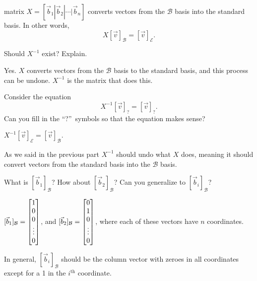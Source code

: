	matrix $X=[\vec b_1|\vec b_2|\cdots|\vec b_n]$ converts
	vectors from the $\mathcal B$ basis into the standard basis. In other words,
	\[
		X[\vec v]_{\mathcal B} = [\vec v]_{\mathcal E}.
	\]
	\begin{parts}
		\item Should $X^{-1}$ exist? Explain.
			\begin{solution}
				Yes. $X$ converts vectors from the
				$\mathcal B$ basis to the standard basis, and this process can be undone.
				$X^{-1}$ is the matrix that does this.
			\end{solution}
		\item Consider the equation
			\[
				X^{-1}[\vec v]_{?} = [\vec v]_{?}.
			\]
			Can you fill in the ``?''~symbols so that the equation makes sense?
			\begin{solution}
				$X^{-1}[\vec v]_{\mathcal E} = [\vec v]_{\mathcal B}$.

				As we said in the previous part $X^{-1}$ should undo what $X$ does,
				meaning it should convert vectors from the standard basis into
				the $\mathcal B$ basis.
			\end{solution}
		\item What is $[\vec b_1]_{\mathcal B}$?  How about $[\vec b_2]_{\mathcal B}$?  Can
			you generalize to $[\vec b_i]_{\mathcal B}$?
			\begin{solution}
				$[\vec b_1]_{\mathcal B}=\begin{bmatrix}1\\0\\0\\\vdots\\0\end{bmatrix}$, and
				$[\vec b_2]_{\mathcal B}=\begin{bmatrix}0\\1\\0\\\vdots\\0\end{bmatrix}$, where each of
				these vectors have $n$ coordinates.

				In general, $[\vec b_i]_{\mathcal B}$ should be the column vector
				with zeroes in all coordinates except for a 1 in the $i^\text{th}$
				coordinate.
			\end{solution}
	\end{parts}

